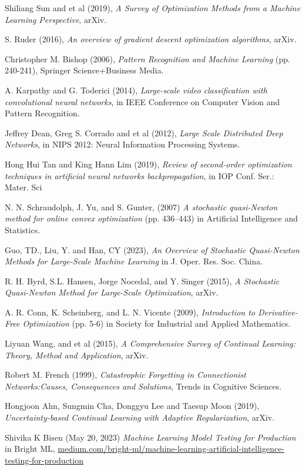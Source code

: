 \documentclass[12pt,a4paper]{article}
\begin{document}
\begin{thebibliography}{9}
	

	Shiliang Sun and et al (2019), \emph{A Survey of Optimization Methods from a Machine Learning Perspective}, arXiv.

	S. Ruder (2016), \emph{An overview of gradient descent optimization algorithms}, arXiv.
		
	Christopher M. Bishop (2006), \emph{Pattern Recognition and Machine Learning} (pp. 240-241), Springer Science+Business Media.
	
	A. Karpathy and G. Toderici (2014), \emph{Large-scale video classification with convolutional neural networks}, in IEEE Conference on Computer Vision and Pattern Recognition.
	
	Jeffrey Dean, Greg S. Corrado and et al (2012), \emph{Large Scale Distributed Deep Networks}, in NIPS 2012: Neural Information Processing Systems.
	
	Hong Hui Tan and King Hann Lim (2019), \emph{Review of second-order optimization techniques in
		artificial neural networks backpropagation}, in IOP Conf. Ser.: Mater. Sci
		
	N. N. Schraudolph, J. Yu, and S. Gunter, (2007) \emph{A stochastic quasi-Newton method for online convex optimization} (pp. 436–443) in Artificial Intelligence and	Statistics.
		
	Guo, TD., Liu, Y. and Han, CY (2023), \emph{An Overview of Stochastic Quasi-Newton Methods for Large-Scale Machine Learning} in J. Oper. Res. Soc. China.
	
	R. H. Byrd, S.L. Hansen, Jorge Nocedal, and Y. Singer (2015), \emph{A Stochastic Quasi-Newton Method for Large-Scale Optimization}, arXiv.
	
	A. R. Conn, K. Scheinberg, and L. N. Vicente (2009), \emph{Introduction to Derivative-Free Optimization} (pp. 5-6) in Society for Industrial and Applied Mathematics.
	
	Liyuan Wang, and et al (2015), \emph{A Comprehensive Survey of Continual Learning: Theory, Method and Application}, arXiv.

	Robert M. French (1999), \emph{Catastrophic Forgetting in Connectionist Networks:Causes, Consequences and Solutions}, Trends in Cognitive Sciences.
	
	Hongjoon Ahn, Sungmin Cha, Donggyu Lee and Taesup Moon (2019), \emph{Uncertainty-based Continual Learning with Adaptive Regularization}, arXiv.
	
	Shivika K Bisen (May 20, 2023) \emph{Machine Learning Model Testing for Production} in Bright ML, \href{https://medium.com/bright-ml/machine-learning-artificial-intelligence-testing-for-production-c561590ff292}{medium.com/bright-ml/machine-learning-artificial-intelligence-testing-for-production}

\end{thebibliography}
\end{document}
